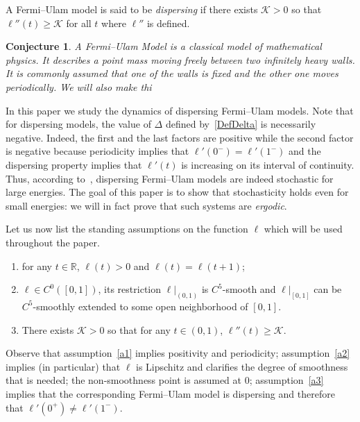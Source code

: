 \documentclass[AHL, Unicode, longabstracts,published]{cedram}
\newcommand{\bR}{\mathbb{R}}
\newcommand{\cK}{\mathcal{K}}
\newtheorem{conjl}{Conjecture}
\newcommand*{\relabel}{\renewcommand{\labelenumi}{(\theenumi)}}
\newcommand*{\aenumi}{\renewcommand*{\theenumi}{a\arabic{enumi}}\relabel}
\begin{document}
\begin{defi}\label{def:dispersingFUM}
A Fermi--Ulam model is said to be \emph{dispersing} if there exists $\cK>0$ so that $\ell''(t)\geq \cK$ for all $t$ where $\ell''$ is defined.
\end{defi}

\begin{conjl}
A Fermi--Ulam Model is a classical model of mathematical physics. It describes a point mass moving freely between two infinitely heavy walls. It is commonly assumed that one of the walls is fixed and the other one moves periodically. We will also make thi
\end{conjl}

In this paper we study the dynamics of dispersing Fermi--Ulam models. Note that for dispersing models, the value of $\Delta$ defined by~\eqref{DefDelta} is necessarily negative. Indeed, the first and the last factors are positive while the second factor is negative because periodicity implies that $\ell'(0^{-})=\ell'(1^{-})$ and the dispersing property implies that $\ell'(t)$ is increasing on its interval of continuity. Thus, according to~\cite{fum}, dispersing Fermi--Ulam models are indeed stochastic for large energies. The goal of this paper is to show that stochasticity holds even for small energies: we will in fact prove that such systems are \emph{ergodic}.

Let us now list the standing assumptions on the function $\ell$ which will be used throughout the paper.
\begin{enumerate}\aenumi
\item\label{a1} for any $t\in\bR$, $\ell(t) > 0$ and $\ell(t) = \ell(t+1)$;
\item\label{a2} $\ell\in C^{0}([0,1])$, its restriction $\ell|_{(0,1)}$ is $C^5$-smooth and $\ell|_{[0,1]}$ can be $C^{5}$-smoothly extended to some open neighborhood of $[0,1]$.
\item\label{a3} There exists $\cK > 0$ so that for any $t\in(0,1)$, $\ell''(t) \ge \cK$.
\end{enumerate}
Observe that assumption~\eqref{a1} implies positivity and periodicity; assumption~\eqref{a2} implies (in particular) that $\ell$ is Lipschitz and clarifies the degree of smoothness that is needed; the non-smoothness point is assumed at $0$; assumption~\eqref{a3} implies that the corresponding Fermi--Ulam model is dispersing and therefore that $\ell'(0^{+})\neq\ell'(1^{-})$.
\end{document}
